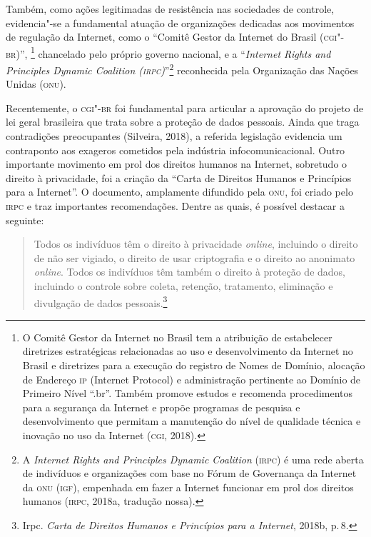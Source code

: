 Também, como ações legitimadas de resistência nas sociedades de
controle, evidencia"-se a fundamental atuação de organizações dedicadas
aos movimentos de regulação da Internet, como o ``Comitê Gestor da
Internet do Brasil (\textsc{cgi"-br})'', \footnote{O Comitê Gestor da Internet no
  Brasil tem a atribuição de estabelecer diretrizes estratégicas
  relacionadas ao uso e desenvolvimento da Internet no Brasil e
  diretrizes para a execução do registro de Nomes de Domínio, alocação
  de Endereço \textsc{ip} (Internet Protocol) e administração pertinente ao
  Domínio de Primeiro Nível ``.br''. Também promove estudos e recomenda
  procedimentos para a segurança da Internet e propõe programas de
  pesquisa e desenvolvimento que permitam a manutenção do nível de
  qualidade técnica e inovação no uso da Internet (\textsc{cgi}, 2018).}
chancelado pelo próprio governo nacional, e a ``\emph{Internet Rights
and Principles Dynamic Coalition (\textsc{irpc})}''\footnote{A \emph{Internet
  Rights and Principles Dynamic Coalition} (\textsc{irpc}) é uma rede aberta de
  indivíduos e organizações com base no Fórum de Governança da Internet
  da \textsc{onu} (\textsc{igf}), empenhada em fazer a Internet funcionar em prol dos
  direitos humanos (\textsc{irpc}, 2018a, tradução nossa).} reconhecida pela Organização das Nações Unidas (\textsc{onu}).

Recentemente, o \textsc{cgi"-br} foi fundamental para articular a aprovação do
projeto de lei geral brasileira que trata sobre a proteção de dados
pessoais. Ainda que traga contradições preocupantes (Silveira, 2018), a
referida legislação evidencia um contraponto aos exageros cometidos pela
indústria infocomunicacional. Outro importante movimento em prol dos
direitos humanos na Internet, sobretudo o direito à privacidade, foi a
criação da ``Carta de Direitos Humanos e Princípios para a Internet''. O
documento, amplamente difundido pela \textsc{onu}, foi criado pelo \textsc{irpc} e traz
importantes recomendações. Dentre as quais, é possível destacar a
seguinte:

\begin{quote}
Todos os indivíduos têm o direito à privacidade \emph{online}, incluindo o
direito de não ser vigiado, o direito de usar criptografia e o direito
ao anonimato \emph{online}. Todos os indivíduos têm também o direito à proteção
de dados, incluindo o controle sobre coleta, retenção, tratamento,
eliminação e divulgação de dados pessoais.\footnote{Irpc. \emph{Carta de Direitos Humanos e Princípios para a Internet}, 2018b, p.\,8.}
\end{quote}

